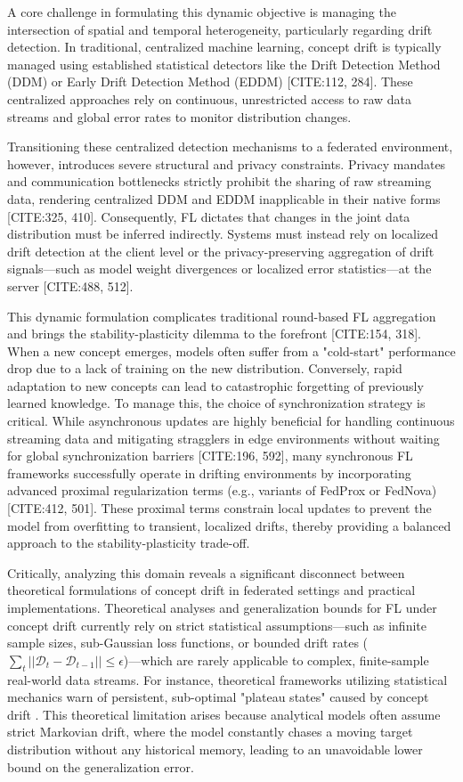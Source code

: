 \documentclass[journal]{IEEEtran}
\begin{document}
A core challenge in formulating this dynamic objective is managing the intersection of spatial and temporal heterogeneity, particularly regarding drift detection. In traditional, centralized machine learning, concept drift is typically managed using established statistical detectors like the Drift Detection Method (DDM) or Early Drift Detection Method (EDDM) [CITE:112, 284]. These centralized approaches rely on continuous, unrestricted access to raw data streams and global error rates to monitor distribution changes. 

Transitioning these centralized detection mechanisms to a federated environment, however, introduces severe structural and privacy constraints. Privacy mandates and communication bottlenecks strictly prohibit the sharing of raw streaming data, rendering centralized DDM and EDDM inapplicable in their native forms [CITE:325, 410]. Consequently, FL dictates that changes in the joint data distribution must be inferred indirectly. Systems must instead rely on localized drift detection at the client level or the privacy-preserving aggregation of drift signals—such as model weight divergences or localized error statistics—at the server [CITE:488, 512].

This dynamic formulation complicates traditional round-based FL aggregation and brings the stability-plasticity dilemma to the forefront [CITE:154, 318]. When a new concept emerges, models often suffer from a "cold-start" performance drop due to a lack of training on the new distribution. Conversely, rapid adaptation to new concepts can lead to catastrophic forgetting of previously learned knowledge. To manage this, the choice of synchronization strategy is critical. While asynchronous updates are highly beneficial for handling continuous streaming data and mitigating stragglers in edge environments without waiting for global synchronization barriers [CITE:196, 592], many synchronous FL frameworks successfully operate in drifting environments by incorporating advanced proximal regularization terms (e.g., variants of FedProx or FedNova) [CITE:412, 501]. These proximal terms constrain local updates to prevent the model from overfitting to transient, localized drifts, thereby providing a balanced approach to the stability-plasticity trade-off.

Critically, analyzing this domain reveals a significant disconnect between theoretical formulations of concept drift in federated settings and practical implementations. Theoretical analyses and generalization bounds for FL under concept drift currently rely on strict statistical assumptions—such as infinite sample sizes, sub-Gaussian loss functions, or bounded drift rates ($\sum_{t} ||\mathcal{D}_t - \mathcal{D}_{t-1}|| \le \epsilon$)—which are rarely applicable to complex, finite-sample real-world data streams. For instance, theoretical frameworks utilizing statistical mechanics warn of persistent, sub-optimal "plateau states" caused by concept drift \cite{Straat2018}. This theoretical limitation arises because analytical models often assume strict Markovian drift, where the model constantly chases a moving target distribution without any historical memory, leading to an unavoidable lower bound on the generalization error. 
\end{document}

